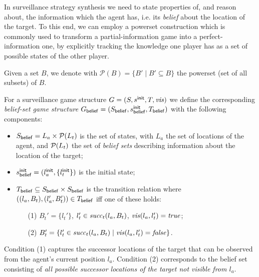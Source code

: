 In surveillance strategy synthesis we need to state properties of, and reason about, the information which the agent has, i.e. its \emph{belief} about the location of the target. To this end, we can employ a powerset construction which is commonly used to transform a partial-information game into a perfect-information one, by explicitly tracking the knowledge one player has as a set of possible states of the other player.

Given a set $B$, we denote with $\mathcal{P}(B) = \{B' \mid B'\subseteq B\}$ the powerset (set of all subsets) of $B$.

For a surveillance game structure $G  = (S,s^{\mathsf{init}},T,\mathit{vis})$ we define the corresponding \emph{belief-set game structure} $G_{\mathsf{belief}}  = (S_{\mathsf{belief}},s^{\mathsf{init}}_{\mathsf{belief}},T_{\mathsf{belief}})$ with the following components:
\begin{itemize}
\item $S_{\mathsf{belief}} = L_a \times \mathcal{P}(L_t)$ is the set of states, with $L_a$ the set of locations of the agent, and $\mathcal{P}(L_t)$ the set of \emph{belief sets} describing information about the location of the target;
\item $s^{\mathsf{init}}_{\mathsf{belief}} = (l_a^{\mathsf{init}},\{l_t^{\mathsf{init}}\})$ is the initial state;
\item $T_{\mathsf{belief}} \subseteq S_{\mathsf{belief}} \times S_{\mathsf{belief}}$ is the transition relation where $((l_a, B_t),(l_a', B_t')) \in T_{\mathsf{belief}}$ iff one of these holds:
\begin{itemize}
\item[(1)] $B_t' = \{l_t'\}$, $l_t' \in \mathit{succ}_t(l_a,B_t)$, $\mathit{vis}(l_a,l_t') = \mathit{true}$;
\item[(2)] $B_t' = \{l_t' \in \mathit{succ}_t(l_a,B_t)  \mid  \mathit{vis}(l_a,l_t') = \mathit{false} \}$.
\end{itemize}
\end{itemize}
Condition (1) captures the successor locations of the target that can be observed from the agent's current position $l_a$. Condition (2) corresponds to the belief set consisting of \emph{all possible successor locations of the target not visible from $l_a$}. 
